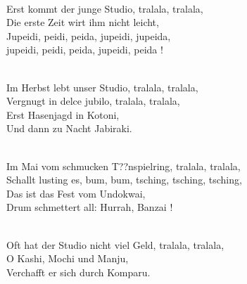 \documentclass[10pt,b5j]{tarticle} %
\begin{document}
\vspace{1.5em} %
\newcommand{\linespace}{0.5em} %
\newcommand{\blocksize}{0.5\hsize} %
\newcommand{\itemmargin}{6em} %
\begin{enumerate} %
    \setlength{\itemindent}{\itemmargin} %
    \begin{minipage}[c]{\blocksize}
    
        \vspace{\linespace}
        \item~\\
        Erst kommt der junge Studio, tralala, tralala,\\
        Die erste Zeit wirt ihm nicht leicht,\\
        	Jupeidi, peidi, peida, jupeidi, jupeida,\\
        	jupeidi, peidi, peida, jupeidi, peida !
        
        \vspace{\linespace}
        \item~\\
        Im Herbst lebt unser Studio, tralala, tralala,\\
        Vergnugt in delce jubilo, tralala, tralala,\\
        Erst Hasenjagd in Kotoni,\\
        Und dann zu Nacht Jabiraki.
        
        \vspace{\linespace}
        \item~\\
        Im Mai vom schmucken T??nspielring, tralala, tralala,\\
        Schallt lusting es, bum, bum, tsching, tsching, tsching,\\
        Das ist das Fest vom Undokwai,\\
        Drum schmettert all: Hurrah, Banzai !
        
        \vspace{\linespace}
        \item~\\
        Oft hat der Studio nicht viel Geld, tralala, tralala,\\
        O Kashi, Mochi und Manju,\\
        Verchafft er sich durch Komparu.
        

\end{minipage}
\end{enumerate}
\end{document}
